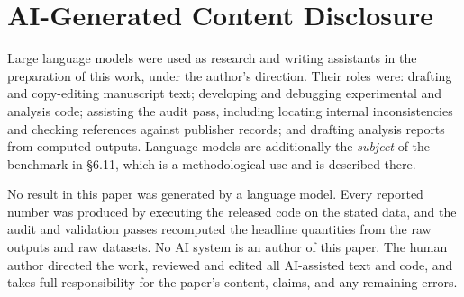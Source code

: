 \section*{AI-Generated Content Disclosure}

Large language models were used as research and writing assistants
in the preparation of this work, under the author's direction. Their
roles were: drafting and copy-editing manuscript text; developing
and debugging experimental and analysis code; assisting the
audit pass, including locating internal inconsistencies and checking
references against publisher records; and drafting analysis reports
from computed outputs. Language models are additionally the
\emph{subject} of the benchmark in \S6.11, which is a methodological
use and is described there.

No result in this paper was generated by a language model. Every
reported number was produced by executing the released code on the
stated data, and the audit and validation passes recomputed the
headline quantities from the raw outputs and raw datasets. No AI
system is an author of this paper. The human author directed the
work, reviewed and edited all AI-assisted text and code, and takes
full responsibility for the paper's content, claims, and any
remaining errors.
